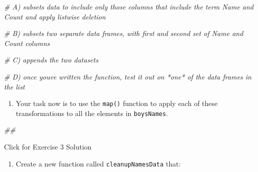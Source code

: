 \documentclass[
]{book}
\newenvironment{Shaded}{\begin{snugshade}}{\end{snugshade}}
\newcommand{\CommentTok}[1]{\textcolor[rgb]{0.56,0.35,0.01}{\textit{#1}}}
\providecommand{\tightlist}{%
  \setlength{\itemsep}{0pt}\setlength{\parskip}{0pt}}
\begin{document}
\begin{Shaded}
\begin{Highlighting}[]
\CommentTok{\# A) subsets data to include only those columns that include the term \textasciigrave{}Name\textasciigrave{} and \textasciigrave{}Count\textasciigrave{} and apply listwise deletion}

\CommentTok{\# B) subsets two separate data frames, with first and second set of \textasciigrave{}Name\textasciigrave{} and \textasciigrave{}Count\textasciigrave{} columns}

\CommentTok{\# C) appends the two datasets}

\CommentTok{\# D) once you\textquotesingle{}ve written the function, test it out on *one* of the data frames in the list}
\end{Highlighting}
\end{Shaded}

\begin{enumerate}
\def\labelenumi{\arabic{enumi}.}
\setcounter{enumi}{1}
\tightlist
\item
  Your task now is to use the \texttt{map()} function to apply each of these transformations to all the elements in \texttt{boysNames}.
\end{enumerate}

\begin{Shaded}
\begin{Highlighting}[]
\CommentTok{\#\# }
\end{Highlighting}
\end{Shaded}

{Click for Exercise 3 Solution}

\begin{enumerate}
\def\labelenumi{\arabic{enumi}.}
\tightlist
\item
  Create a new function called \texttt{cleanupNamesData} that:
\end{enumerate}
\end{document}
